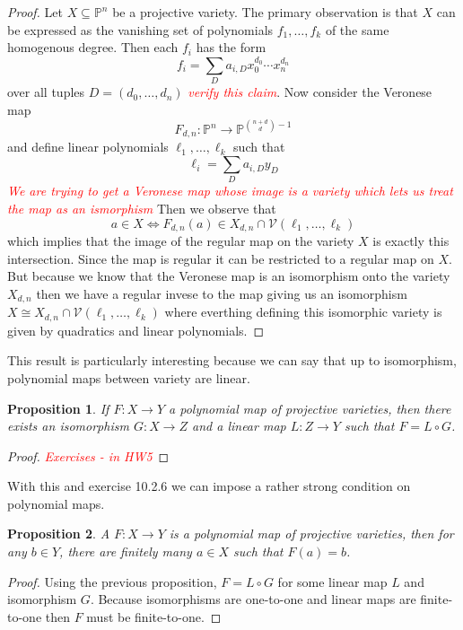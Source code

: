 \documentclass[40pt]{article}
\newcommand{\Proj}{\mathbb{P}}
\newcommand{\V}{\mathcal{V}}
\newcommand{\note}[1]{\textcolor{red}{\emph{#1}}}
\newtheorem{proposition}{Proposition}[section]
\theoremstyle{remark}
\begin{document}
			\begin{proof}
				Let $X \subseteq \Proj^n$ be a projective variety. The primary observation is that $X$ can be expressed as the vanishing set of polynomials $f_1,\dots,f_k$ of the same homogenous degree. Then each $f_i$ has the form
				\[
				f_i = \sum_D a_{i,D}x_0^{d_0}\cdots x_{n}^{d_n}
				\]
				over all tuples $D = (d_0,\dots,d_n)$ \note{verify this claim}. Now consider the Veronese map
				\[
				F_{d,n} : \Proj^n \rightarrow \Proj^{{n + d \choose d} - 1}
				\] 
				and define linear polynomials $\ell_1,\dots, \ell_k$ such that 
				\[
				\ell_i = \sum_{D}a_{i,D}y_D
				\]
				\note{We are trying to get a Veronese map whose image is a variety which lets us treat the map as an ismorphism} Then we observe that 
				\[
				a \in X \iff F_{d,n}(a) \in X_{d,n} \cap \V(\ell_1,\dots,\ell_k)
				\]
				which implies that the image of the regular map on the variety $X$ is exactly this intersection. Since the map is regular it can be restricted to a regular map on $X$. But because we know that the Veronese map is an isomorphism onto the variety $X_{d,n}$ then we have a regular invese to the map giving us an isomorphism $X \cong X_{d,n} \cap \V(\ell_1,\dots,\ell_k)$ where everthing defining this isomorphic variety is given by quadratics and linear polynomials. 
			\end{proof}
			This result is particularly interesting because we can say that up to isomorphism, polynomial maps between variety are linear.
			\begin{proposition}
				If $F: X\rightarrow Y$ a polynomial map of projective varieties, then there exists an isomorphism $G:X \rightarrow Z$ and a linear map $L : Z \rightarrow Y$ such that $F = L \circ G$. 
			\end{proposition}
			\begin{proof}
				\note{Exercises - in HW5}
			\end{proof}
			With this and exercise 10.2.6 we can impose a rather strong condition on polynomial maps. 
			\begin{proposition}
				A $F: X\rightarrow Y$ is a polynomial map of projective varieties, then for any $b \in Y$, there are finitely many $a \in X$ such that $F(a) = b$. 
			\end{proposition}
			\begin{proof}
				Using the previous proposition, $F = L \circ G$ for some linear map $L$ and isomorphism $G$. Because isomorphisms are one-to-one and linear maps are finite-to-one then $F$ must be finite-to-one.
			\end{proof}
\end{document}
